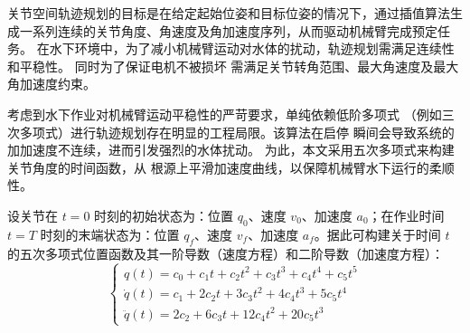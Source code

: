




关节空间轨迹规划的目标是在给定起始位姿和目标位姿的情况下，通过插值算法生成一系列连续的关节角度、角速度及角加速度序列，从而驱动机械臂完成预定任务。
在水下环境中，为了减小机械臂运动对水体的扰动，轨迹规划需满足连续性和平稳性。
同时为了保证电机不被损坏 需满足关节转角范围、最大角速度及最大角加速度约束。

考虑到水下作业对机械臂运动平稳性的严苛要求，单纯依赖低阶多项式
（例如三次多项式）进行轨迹规划存在明显的工程局限。该算法在启停
瞬间会导致系统的加加速度不连续，进而引发强烈的水体扰动。
为此，本文采用五次多项式来构建关节角度的时间函数，从
根源上平滑加速度曲线，以保障机械臂水下运行的柔顺性。

设关节在 $t=0$ 时刻的初始状态为：位置 $q_0$、速度 $v_0$、加速度 $a_0$；在作业时间 $t=T$ 时刻的末端状态为：位置 $q_f$、速度 $v_f$、加速度 $a_f$。据此可构建关于时间 $t$ 的五次多项式位置函数及其一阶导数（速度方程）和二阶导数（加速度方程）：
\begin{equation}
    \begin{cases}
    q(t) = c_0 + c_1 t + c_2 t^2 + c_3 t^3 + c_4 t^4 + c_5 t^5\\
    \dot{q}(t) = c_1 + 2c_2 t + 3c_3 t^2 + 4c_4 t^3 + 5c_5 t^4\\
    \ddot{q}(t) = 2c_2 + 6c_3 t + 12c_4 t^2 + 20c_5 t^3
    \end{cases}
\end{equation}

